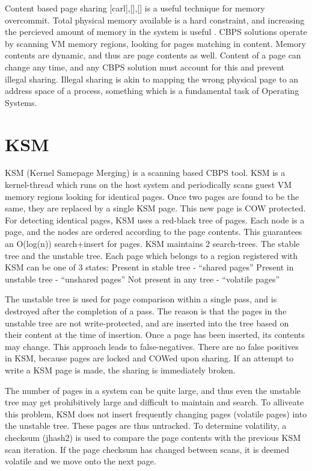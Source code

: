 \documentclass[11pt]{article}
\begin{document}
Content based page sharing [carl],[],[] is a useful technique for
memory overcommit. Total physical memory available is a hard
constraint, and increasing the percieved amount of memory in the
system is useful .
CBPS solutions operate by scanning VM memory regions, looking for
pages matching in content. 
Memory contents are dynamic, and thus are page contents as well.
Content of a page can change any time, and any CBPS solution must
account for this and prevent illegal sharing. Illegal sharing is akin
to mapping the wrong physical page to an address space of a process,
something which is a fundamental task of Operating Systems.
\section{KSM}
\label{sec-6}

KSM (Kernel Samepage Merging) is a scanning based CBPS tool. KSM is a kernel-thread which runs on the host system and periodically scans guest VM memory regions looking for identical pages.
Once two pages are found to be the same, they are replaced by a single KSM page. This new page is COW protected.
For detecting identical pages, KSM uses a red-black tree of pages. Each node is a page, and the nodes are ordered according to the page contents. This guarantees an O(log(n)) search+insert for pages.
KSM maintains 2 search-trees. The stable tree and the unstable tree. Each page which belongs to a region registered with KSM can be one of 3 states:
Present in stable tree - ``shared pages''
Present in unstable tree - ``unshared pages'' 
Not present in any tree - ``volatile pages''

The unstable tree is used for page comparison within a single pass, and is destroyed after the completion of a pass. The reason is that the pages in the unstable tree are not write-protected, and are inserted into the tree based on their content at the time of insertion. Once a page has been inserted, its contents may change. This approach leads to false-negatives. There are no false positives in KSM, because pages are locked and COWed upon sharing. If an attempt to write a KSM page is made, the sharing is immediately broken.

The number of pages in a system can be quite large, and thus even the unstable tree may get prohibitively large and difficult to maintain and search. To alliveate this problem, KSM does not insert frequently changing pages (volatile pages) into the unstable tree. These pages are thus untracked.
To determine volatility, a checksum (jhash2) is used to compare the page contents with the previous KSM scan iteration. If the page checksum has changed between scans, it is deemed volatile and we move onto the next page.
\end{document}
